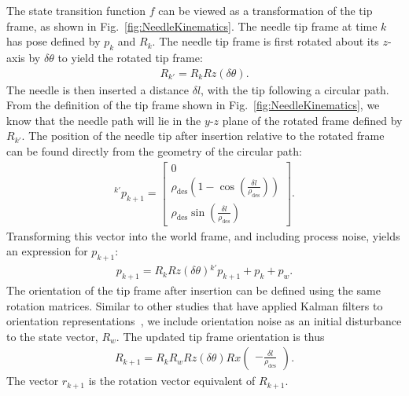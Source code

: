 The state transition function $f$ can be viewed as a transformation of the tip frame, as shown in Fig.~\ref{fig:NeedleKinematics}. The needle tip frame at time ${k}$ has pose defined by ${p_{k}}$ and ${R_{k}}$. The needle tip frame is first rotated about its $z$-axis by $\delta\theta$ to yield the rotated tip frame:
\begin{align}
{R_{k'}} = {R_{k}}{Rz}(\delta\theta).
\end{align}
The needle is then inserted a distance $\delta l$, with the tip following a circular path. From the definition of the tip frame shown in Fig.~\ref{fig:NeedleKinematics}, we know that the needle path will lie in the $y$-$z$ plane of the rotated frame defined by ${R_{k'}}$. The position of the needle tip after insertion relative to the rotated frame can be found directly from the geometry of the circular path:
\begin{align}
{^{k'}p_{k+1}} = \begin{bmatrix}0\\ \rho_\text{des}(1-\cos(\frac{\delta l}{\rho_\text{des}})) \\ \rho_\text{des}\sin(\frac{\delta l}{\rho_\text{des}})\end{bmatrix}.
\end{align}
Transforming this vector into the world frame, and including process noise, yields an expression for $p_{k+1}$:
\begin{align}
{p_{k+1}} = {R_{k}}{Rz}(\delta\theta){^{k'}p_{k+1}}+{p_k} +{p_w}.
\end{align}
The orientation of the tip frame after insertion can be defined using the same rotation matrices. Similar to other studies that have applied Kalman filters to orientation representations~\cite{Kraft2003}, we include orientation noise as an initial disturbance to the state vector, ${R_w}$.
The updated tip frame orientation is thus
\begin{align}
{R_{k+1}} = {R_{k}}{R_w}{Rz}(\delta\theta){Rx}\left(\begin{matrix}-\frac{\delta l}{\rho_\text{des}}\end{matrix}\right).
\end{align}
The vector ${r_{k+1}}$ is the rotation vector equivalent of ${R_{k+1}}$.

